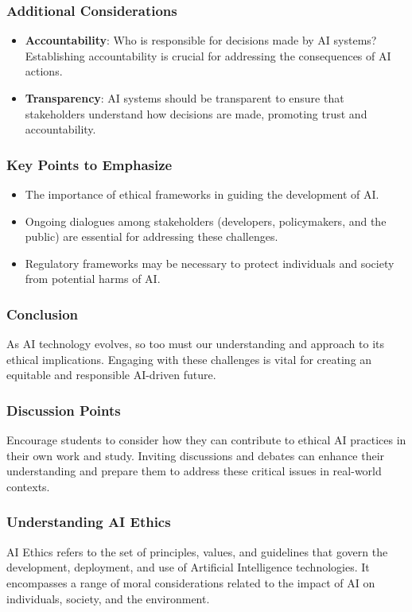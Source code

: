 \documentclass[aspectratio=169]{beamer}
\begin{document}
\begin{frame}[fragile]
    \frametitle{Additional Considerations}
    \begin{itemize}
        \item \textbf{Accountability}: Who is responsible for decisions made by AI systems? Establishing accountability is crucial for addressing the consequences of AI actions.
        \item \textbf{Transparency}: AI systems should be transparent to ensure that stakeholders understand how decisions are made, promoting trust and accountability.
    \end{itemize}
\end{frame}

\begin{frame}[fragile]
    \frametitle{Key Points to Emphasize}
    \begin{itemize}
        \item The importance of ethical frameworks in guiding the development of AI.
        \item Ongoing dialogues among stakeholders (developers, policymakers, and the public) are essential for addressing these challenges.
        \item Regulatory frameworks may be necessary to protect individuals and society from potential harms of AI.
    \end{itemize}
\end{frame}

\begin{frame}[fragile]
    \frametitle{Conclusion}
    As AI technology evolves, so too must our understanding and approach to its ethical implications. 
    Engaging with these challenges is vital for creating an equitable and responsible AI-driven future.
\end{frame}

\begin{frame}[fragile]
    \frametitle{Discussion Points}
    Encourage students to consider how they can contribute to ethical AI practices in their own work and study. 
    Inviting discussions and debates can enhance their understanding and prepare them to address these critical issues in real-world contexts.
\end{frame}

\begin{frame}[fragile]
    \frametitle{Understanding AI Ethics}
    AI Ethics refers to the set of principles, values, and guidelines that govern the development, deployment, and use of Artificial Intelligence technologies. It encompasses a range of moral considerations related to the impact of AI on individuals, society, and the environment.
\end{frame}
\end{document}
